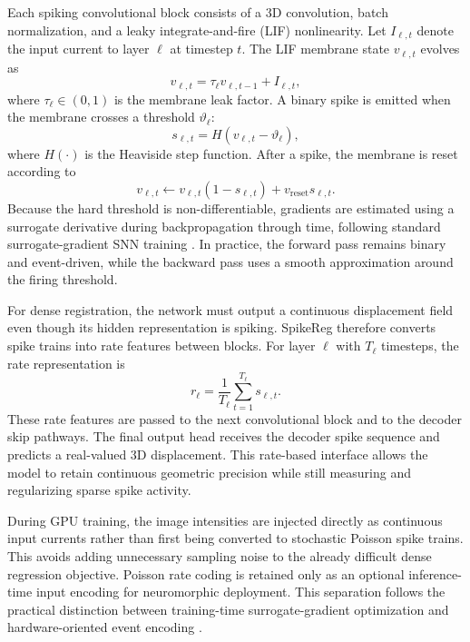 Each spiking convolutional block consists of a 3D convolution, batch normalization, and a leaky integrate-and-fire (LIF) nonlinearity. Let $I_{\ell,t}$ denote the input current to layer $\ell$ at timestep $t$. The LIF membrane state $v_{\ell,t}$ evolves as
\begin{equation}
    v_{\ell,t} = \tau_{\ell} v_{\ell,t-1} + I_{\ell,t},
\end{equation}
where $\tau_{\ell} \in (0,1)$ is the membrane leak factor. A binary spike is emitted when the membrane crosses a threshold $\vartheta_{\ell}$:
\begin{equation}
    s_{\ell,t} = H(v_{\ell,t} - \vartheta_{\ell}),
\end{equation}
where $H(\cdot)$ is the Heaviside step function. After a spike, the membrane is reset according to
\begin{equation}
    v_{\ell,t} \leftarrow v_{\ell,t}(1-s_{\ell,t}) + v_{\mathrm{reset}}s_{\ell,t}.
\end{equation}
Because the hard threshold is non-differentiable, gradients are estimated using a surrogate derivative during backpropagation through time, following standard surrogate-gradient SNN training \citep{zenke2018superspike,neftci2019surrogate}. In practice, the forward pass remains binary and event-driven, while the backward pass uses a smooth approximation around the firing threshold.


For dense registration, the network must output a continuous displacement field even though its hidden representation is spiking. SpikeReg therefore converts spike trains into rate features between blocks. For layer $\ell$ with $T_{\ell}$ timesteps, the rate representation is
\begin{equation}
    r_{\ell} = \frac{1}{T_{\ell}} \sum_{t=1}^{T_{\ell}} s_{\ell,t}.
\end{equation}
These rate features are passed to the next convolutional block and to the decoder skip pathways. The final output head receives the decoder spike sequence and predicts a real-valued 3D displacement. This rate-based interface allows the model to retain continuous geometric precision while still measuring and regularizing sparse spike activity.

During GPU training, the image intensities are injected directly as continuous input currents rather than first being converted to stochastic Poisson spike trains. This avoids adding unnecessary sampling noise to the already difficult dense regression objective. Poisson rate coding is retained only as an optional inference-time input encoding for neuromorphic deployment. This separation follows the practical distinction between training-time surrogate-gradient optimization and hardware-oriented event encoding \citep{rueckauer2017conversion,neftci2019surrogate}.

